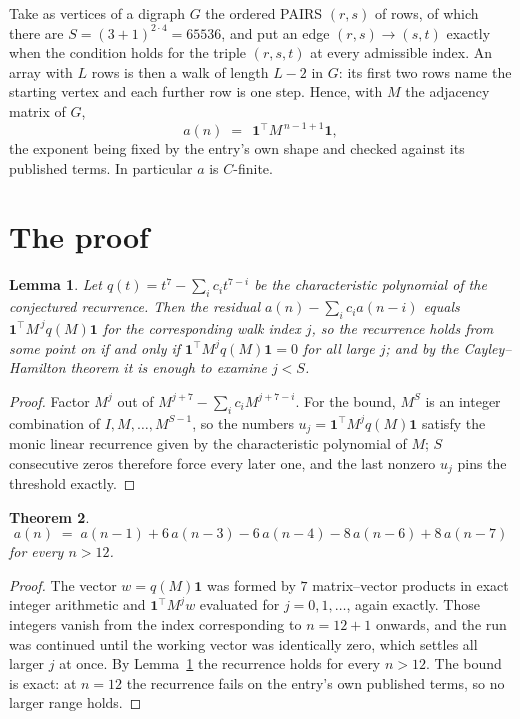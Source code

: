 \documentclass[11pt,a4paper]{article}
\theoremstyle{plain}
\newtheorem{theorem}{Theorem}
\newtheorem{lemma}[theorem]{Lemma}
\theoremstyle{definition}
\begin{document}
Take as vertices of a digraph $G$ the ordered PAIRS $(r,s)$ of rows, of which there are
$S=(3+1)^{2\cdot4}=65536$, and put an edge $(r,s)\to(s,t)$ exactly when the condition
holds for the triple $(r,s,t)$ at every admissible index. An array with $L$ rows is then a
walk of length $L-2$ in $G$: its first two rows name the starting vertex and each further
row is one step. Hence, with $M$ the adjacency matrix of $G$,
\[
a(n)\;=\;\,\mathbf{1}^{\!\top}M^{\,n-1+1}\mathbf{1},
\]
the exponent being fixed by the entry's own shape and checked against its published terms.
In particular $a$ is $C$-finite.

\section{The proof}

\begin{lemma}\label{lem:crit}
Let $q(t)=t^{7}-\sum_i c_it^{7-i}$ be the characteristic polynomial of the
conjectured recurrence. Then the residual $a(n)-\sum_ic_ia(n-i)$ equals
$\mathbf{1}^{\!\top}M^{\,j}q(M)\mathbf{1}$ for the corresponding walk index
$j$, so the recurrence holds from some point on if and only if
$\mathbf{1}^{\!\top}M^{j}q(M)\mathbf{1}=0$ for all large $j$; and by the
Cayley--Hamilton theorem it is enough to examine $j<S$.
\end{lemma}

\begin{proof}
Factor $M^{j}$ out of $M^{j+7}-\sum_ic_iM^{j+7-i}$. For the bound, $M^{S}$
is an integer combination of $I,M,\dots,M^{S-1}$, so the numbers
$u_j=\mathbf{1}^{\!\top}M^{j}q(M)\mathbf{1}$ satisfy the monic linear recurrence given by
the characteristic polynomial of $M$; $S$ consecutive zeros therefore force every later one,
and the last nonzero $u_j$ pins the threshold exactly.
\end{proof}

\begin{theorem}
\[
a(n)\;=\;a(n-1) + 6\,a(n-3) - 6\,a(n-4) - 8\,a(n-6) + 8\,a(n-7)
\]
for every $n>12$.
\end{theorem}

\begin{proof}
The vector $w=q(M)\mathbf{1}$ was formed by $7$ matrix--vector products in exact
integer arithmetic and $\mathbf{1}^{\!\top}M^{j}w$ evaluated for $j=0,1,\dots$, again
exactly. Those integers vanish from the index corresponding to $n=12+1$ onwards, and the
run was continued until the working vector was identically zero, which settles all larger $j$
at once. By Lemma~\ref{lem:crit} the recurrence holds for every $n>12$. The bound is exact: at $n=12$ the recurrence fails on the entry's own published terms, so no larger range holds.
\end{proof}
\end{document}
